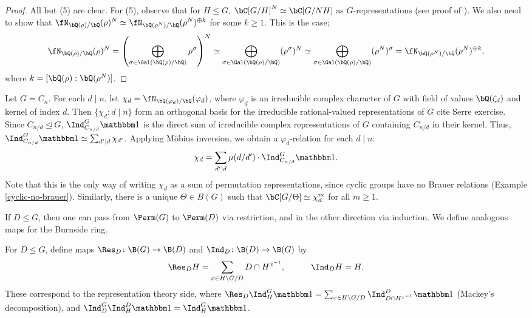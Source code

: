 \begin{proof}
    All but (5) are clear. For (5), observe that for $H \leq G$, $\bC[G / H]^N \simeq \bC[G / NH]$ as $G$-representations (see proof of \cite[Theorem 2.8]{reg-const}). We also need to show that $\repnorm{\rho}^N \simeq \repnorm{\rho^N}^{\oplus k}$ for some $k \geq 1$. This is the case; 
    $$\repnorm{\rho}^N = \left(\bigoplus_{\sigma \in \Gal(\bQ(\rho) / \bQ)} \rho^{\sigma} \right)^N \simeq 
    \bigoplus_{\sigma \in \Gal(\bQ(\rho) / \bQ)} (\rho^{\sigma})^N \simeq \bigoplus_{\sigma \in \Gal(\bQ(\rho) / \bQ)} (\rho^N)^{\sigma} = \repnorm{\rho^N}^{\oplus k},$$
    where $k = [ \bQ(\rho) : \bQ(\rho^N)]$. 
\end{proof}


\begin{example}\label{cyclic-relns}
    Let $G = C_n$. For each $d \mid n$, let $\chi_d = \repnorm{\varphi_d}$, where $\varphi_d$ is an irreducible complex character of $G$ with field of values $\bQ(\zeta_d)$ and kernel of index $d$.
    Then $\{ \chi_d \colon d\mid n \}$ form an orthogonal basis for the irreducible rational-valued representations of $G$ {\color{red} cite Serre exercise}. Since $C_{n / d} \trianglelefteq G$, $\Ind_{C_{n/ d}}^G \trivial$ is the direct sum of irreducible complex representations of $G$ containing $C_{n / d}$ in their kernel. Thus, $\Ind_{C_{n/ d}}^G \trivial \simeq \sum_{d' \mid d} \chi_{d'}$. Applying M\"{o}bius inversion, we obtain a $\varphi_d$-relation for each $d \mid n$:
    \[ \chi_d = \sum_{d' \mid d} \mu(d / d') \cdot \Ind_{C_{n/ d}}^G \trivial. \]
    Note that this is the only way of writing $\chi_d$ as a sum of permutation representations, since cyclic groups have no Brauer relations (Example \ref{cyclic-no-brauer}). Similarly, there is a unique $\Theta \in B(G)$ such that $\bC[G / \Theta] \simeq \chi_d^{m}$ for all $m \geq 1$.
    \end{example}

If $D \leq G$, then one can pass from $\Perm(G)$ to $\Perm(D)$ via restriction, and in the other direction via induction. We define analogous maps for the Burnside ring.    

\begin{defn}
    For $D \leq G$, define maps $\Res_D \colon \B(G) \to \B(D)$ and $\Ind_D \colon \B(D) \to \B(G)$ by
    \[  \Res_D H = \sum_{x \in H \backslash G / D} D \cap H^{x^{-1}}, \qquad \quad \Ind_D H = H. \]
    These correspond to the representation theory side, where $\Res_D \Ind_{H}^G \trivial = \sum_{x \in H \backslash G / D} \Ind_{D \cap H^{x^{-1}}}^D \trivial$ (Mackey's decomposition), and $\Ind_{D}^G\Ind_{H}^D \trivial = \Ind_{H}^G \trivial$.
\end{defn}
